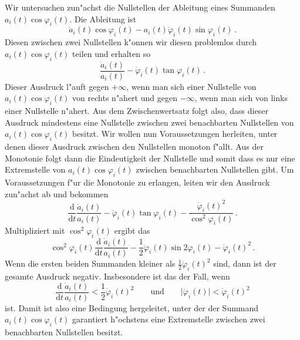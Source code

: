 \documentclass{scrartcl}
\newcommand{\de}{{\mathrm{d}}}
\begin{document}
Wir untersuchen zun"achst die Nullstellen der Ableitung eines Summanden $a_i(t)\cos\varphi_i(t)$. Die Ableitung ist
$$ \dot a_i(t)\cos\varphi_i(t)-a_i(t)\dot\varphi_i(t)\sin\varphi_i(t)\,. $$
Diesen zwischen zwei Nullstellen k"onnen wir diesen problemlos durch $a_i(t)\cos\varphi_i(t)$ teilen und erhalten so
$$ \frac{\dot a_i(t)}{a_i(t)}
-\dot\varphi_i(t)\tan\varphi_i(t)\,. $$
Dieser Ausdruck l"auft gegen $+\infty$, wenn man sich einer Nullstelle von $a_i(t)\cos\varphi_i(t)$ von rechts n"ahert und gegen $-\infty$, wenn man sich von links einer Nullstelle n"ahert. Aus dem Zwischenwertsatz folgt also, dass dieser Ausdruck mindestens eine Nullstelle zwischen zwei benachbarten Nullstellen von $a_i(t)\cos\varphi_i(t)$ besitzt. Wir wollen nun Voraussetzungen herleiten, unter denen dieser Ausdruck zwischen den Nullstellen monoton f"allt. Aus der Monotonie folgt dann die Eindeutigkeit der Nullstelle und somit dass es nur eine Extremstelle von $a_i(t)\cos\varphi_i(t)$ zwischen benachbarten Nullstellen gibt. Um Voraussetzungen f"ur die Monotonie zu erlangen, leiten wir den Ausdruck zun"achst ab und bekommen
$$ \frac{\de}{\de t}\frac{\dot a_i(t)}{a_i(t)}
-\ddot\varphi_i(t)\tan\varphi_i(t)
-\frac{\dot\varphi_i(t)^2}{\cos^2\varphi_i(t)}\,. $$
Multipliziert mit $\cos^2\varphi_i(t)$ ergibt das
$$ \cos^2\varphi_i(t)\frac{\de}{\de t}\frac{\dot a_i(t)}{a_i(t)}
-\frac12\ddot\varphi_i(t)\sin 2\varphi_i(t)
-\dot\varphi_i(t)^2\,. $$
Wenn die ersten beiden Summanden kleiner als $\frac12\dot\varphi_i(t)^2$ sind, dann ist der gesamte Ausdruck negativ. Insbesondere ist das der Fall, wenn 
$$ \frac{\de}{\de t}\frac{\dot a_i(t)}{a_i(t)} < \frac12\dot\varphi_i(t)^2
\qquad \text{und} \qquad
\lvert\ddot\varphi_i(t)\rvert < \dot\varphi_i(t)^2 $$
ist. Damit ist also eine Bedingung hergeleitet, unter der der Summand $a_i(t)\cos\varphi_i(t)$ garantiert h"ochstens eine Extremstelle zwischen zwei benachbarten Nullstellen besitzt. 
\end{document}
